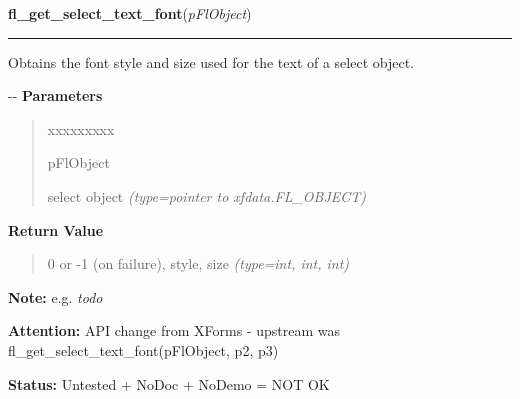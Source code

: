 \hspace{.8\funcindent}\begin{boxedminipage}{\funcwidth}

    \raggedright \textbf{fl\_get\_select\_text\_font}(\textit{pFlObject})

    \vspace{-1.5ex}

    \rule{\textwidth}{0.5\fboxrule}
\setlength{\parskip}{2ex}

Obtains the font style and size used for the text of a select object.

-{}-
\setlength{\parskip}{1ex}
      \textbf{Parameters}
      \vspace{-1ex}

      \begin{quote}
        \begin{Ventry}{xxxxxxxxx}

          \item[pFlObject]


select object
            {\it (type=pointer to xfdata.FL\_OBJECT)}

        \end{Ventry}

      \end{quote}

      \textbf{Return Value}
    \vspace{-1ex}

      \begin{quote}

0 or -1 (on failure), style, size
      {\it (type=int, int, int)}

      \end{quote}

\textbf{Note:} 
e.g. \emph{todo}


\textbf{Attention:} 
API change from XForms - upstream was
fl\_get\_select\_text\_font(pFlObject, p2, p3)


\textbf{Status:} 
Untested + NoDoc + NoDemo = NOT OK


    \end{boxedminipage}

    \label{xformslib:flselect:fl_set_select_text_font}

    \vspace{0.5ex}

